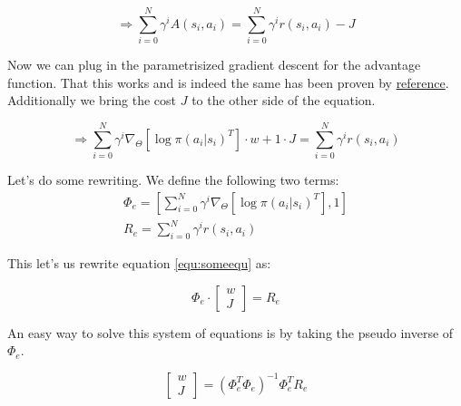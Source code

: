 \begin{equation}
	\Rightarrow \sum_{i = 0}^{N}\gamma^i A(s_i, a_i) = \sum_{i = 0}^{N}\gamma^i r(s_i, a_i) - J
\end{equation}

\noindent Now we can plug in the parametrisized gradient descent for the advantage function. That this works and is indeed the same has been proven by \underline{reference}. Additionally we bring the cost $J$ to the other side of the equation.

\begin{equation}
	\label{equ:someequ}
	\Rightarrow \sum_{i = 0}^{N} \gamma^i \nabla_{\Theta} \left[\log \pi(a_i | s_i)^T\right] \cdot w + 1 \cdot J = \sum_{i = 0}^{N}\gamma^i r(s_i, a_i)
\end{equation}

\noindent Let's do some rewriting. We define the following two terms:
\begin{align}
	\Phi_e = \left[  \sum_{i = 0}^{N} \gamma^i \nabla_{\Theta} \left[\log \pi(a_i | s_i)^T\right] , 1 \right]\\
	R_e = \sum_{i = 0}^{N}\gamma^i r(s_i, a_i)
\end{align}

\noindent This let's us rewrite equation \ref{equ:someequ} as:

\begin{equation}
	\Phi_e \cdot \begin{bmatrix} w\\J \end{bmatrix}  = R_e
\end{equation}

\noindent An easy way to solve this system of equations is by taking the pseudo inverse of $\Phi_e$.

\begin{equation}
	\begin{bmatrix} w\\J \end{bmatrix} = (\Phi_e^T \Phi_e)^{-1} \Phi_e^T R_e
\end{equation}




